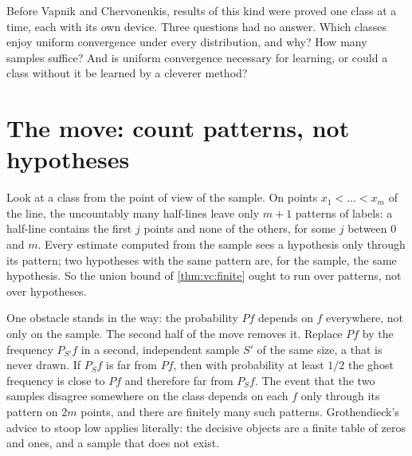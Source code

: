 \begin{refsection}
Before Vapnik and Chervonenkis, results of this kind were proved one class at a time, each with its own device. Three questions had no answer. Which classes enjoy uniform convergence under every distribution, and why? How many samples suffice? And is uniform convergence necessary for learning, or could a class without it be learned by a cleverer method?

\section{The move: count patterns, not hypotheses}\label{sec:vc:move}

Look at a class from the point of view of the sample. On points $x_1<\dots<x_m$ of the line, the uncountably many half-lines leave only $m+1$ patterns of labels: a half-line contains the first $j$ points and none of the others, for some $j$ between $0$ and $m$. Every estimate computed from the sample sees a hypothesis only through its pattern; two hypotheses with the same pattern are, for the sample, the same hypothesis. So the union bound of \cref{thm:vc:finite} ought to run over patterns, not over hypotheses.

One obstacle stands in the way: the probability $Pf$ depends on $f$ everywhere, not only on the sample. The second half of the move removes it. Replace $Pf$ by the frequency $P_{S'}f$ in a second, independent sample $S'$ of the same size, a  that is never drawn. If $P_Sf$ is far from $Pf$, then with probability at least $1/2$ the ghost frequency is close to $Pf$ and therefore far from $P_Sf$. The event that the two samples disagree somewhere on the class depends on each $f$ only through its pattern on $2m$ points, and there are finitely many such patterns. Grothendieck's advice to stoop low applies literally: the decisive objects are a finite table of zeros and ones, and a sample that does not exist.



\end{refsection}
